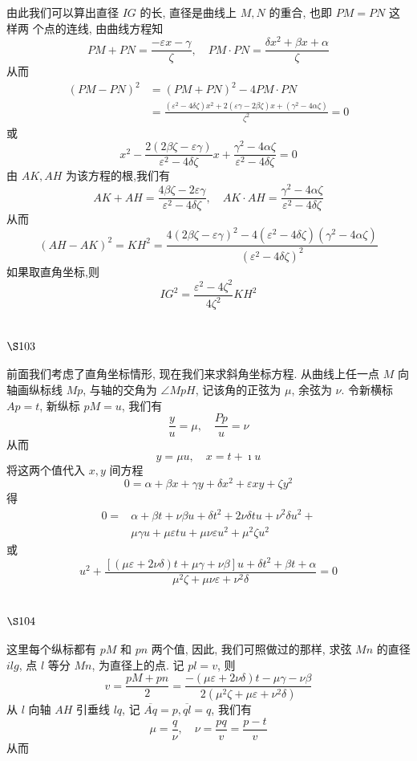 由此我们可以算出直径 $I G$ 的长, 直径是曲线上 $M, N$ 的重合, 也即 $P M=P N$ 这样两 个点的连线, 由曲线方程知
\[
P M+P N=\frac{-\varepsilon x-\gamma}{\zeta}, \quad P M \cdot P N=\frac{\delta x^{2}+\beta x+\alpha}{\zeta}
\]
从而
\[
\begin{aligned}
(P M-P N)^{2} & =(P M+P N)^{2}-4 P M \cdot P N \\
& =\frac{\left(\varepsilon^{2}-4 \delta \zeta\right) x^{2}+2(\varepsilon \gamma-2 \beta \zeta) x+\left(\gamma^{2}-4 \alpha \zeta\right)}{\zeta^{2}}=0
\end{aligned}
\]
或
\[
x^{2}-\frac{2(2 \beta \zeta-\varepsilon \gamma)}{\varepsilon^{2}-4 \delta \zeta} x+\frac{\gamma^{2}-4 \alpha \zeta}{\varepsilon^{2}-4 \delta \zeta}=0
\]
由 $A K, A H$ 为该方程的根,我们有
\[
A K+A H=\frac{4 \beta \zeta-2 \varepsilon \gamma}{\varepsilon^{2}-4 \delta \zeta}, \quad A K \cdot A H=\frac{\gamma^{2}-4 \alpha \zeta}{\varepsilon^{2}-4 \delta \zeta}
\]
从而
\[
(A H-A K)^{2}=K H^{2}=\frac{4(2 \beta \zeta-\varepsilon \gamma)^{2}-4\left(\varepsilon^{2}-4 \delta \zeta\right)\left(\gamma^{2}-4 \alpha \zeta\right)}{\left(\varepsilon^{2}-4 \delta \zeta\right)^{2}}
\]
如果取直角坐标,则
\[
I G^{2}=\frac{\varepsilon^{2}-4 \zeta^{2}}{4 \zeta^{2}} K H^{2}
\]
\section{$\S 103$}

前面我们考虑了直角坐标情形, 现在我们来求斜角坐标方程. 从曲线上任一点 $M$ 向 轴画纵标线 $M p$, 与轴的交角为 $\angle M p H$, 记该角的正弦为 $\mu$, 余弦为 $\nu$. 令新横标 $A p=t$, 新纵标 $p M=u$, 我们有
\[
\frac{y}{u}=\mu, \quad \frac{P p}{u}=\nu
\]
从而
\[
y=\mu u, \quad x=t+\imath u
\]
将这两个值代入 $x, y$ 间方程
\[
0=\alpha+\beta x+\gamma y+\delta x^{2}+\varepsilon x y+\zeta y^{2}
\]
得
\[
\begin{aligned}
0= & \alpha+\beta t+\nu \beta u+\delta t^{2}+2 \nu \delta t u+\nu^{2} \delta u^{2}+ \\
& \mu \gamma u+\mu \varepsilon t u+\mu \nu \varepsilon u^{2}+\mu^{2} \zeta u^{2}
\end{aligned}
\]
或
\[
u^{2}+\frac{[(\mu \varepsilon+2 \nu \delta) t+\mu \gamma+\nu \beta] u+\delta t^{2}+\beta t+\alpha}{\mu^{2} \zeta+\mu \nu \varepsilon+\nu^{2} \delta}=0
\]
\section{$\S 104$}

这里每个纵标都有 $p M$ 和 $p n$ 两个值, 因此, 我们可照做过的那样, 求弦 $M n$ 的直径 $i l g$, 点 $l$ 等分 $M n$, 为直径上的点. 记 $p l=v$, 则
\[
v=\frac{p M+p n}{2}=\frac{-(\mu \varepsilon+2 \nu \delta) t-\mu \gamma-\nu \beta}{2\left(\mu^{2} \zeta+\mu \varepsilon+\nu^{2} \delta\right)}
\]
从 $l$ 向轴 $A H$ 引垂线 $l q$, 记 $\overline{A q}=p, \overline{q l}=q$, 我们有
\[
\mu=\frac{q}{\nu}, \quad \nu=\frac{p q}{v}=\frac{p-t}{v}
\]
从而

